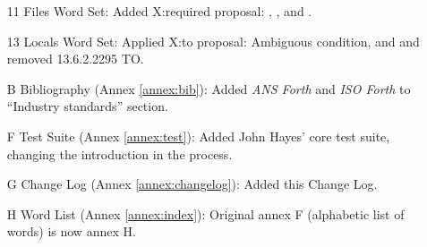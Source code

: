 \begin{itemize}
	\item[11] Files Word Set:
		Added \textsf{X:required} proposal:
		,
		,
		 and
		.

	\item[13] Locals Word Set:
		Applied \textsf{X:to} proposal:
		Ambiguous condition,
		 and \linebreak
		 and removed 13.6.2.2295 TO.

	\item[B] Bibliography (Annex \ref{annex:bib}):
		Added \emph{ANS Forth} and \emph{ISO Forth} to
		``Industry standards'' section.

	\item[F] Test Suite (Annex \ref{annex:test}):
		Added John Hayes' core test suite, changing the
		introduction in the process.

	\item[G] Change Log (Annex \ref{annex:changelog}):
		Added this Change Log.

	\item[H] Word List (Annex \ref{annex:index}):
		Original annex F (alphabetic list of words) is now
		annex H.
	\end{itemize}


